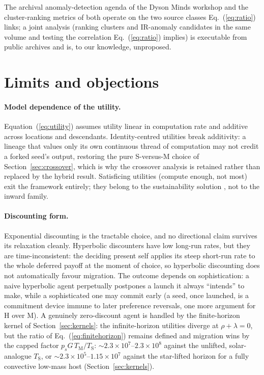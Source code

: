 \documentclass[11pt]{article}
\begin{document}
The archival anomaly-detection agenda of the Dyson Minds workshop \citep{Curtis2026DysonMinds} and the cluster-ranking metrics of \citet{Huang2026Crystallization} both operate on the two source classes Eq.~(\ref{eq:ratio}) links; a joint analysis (ranking clusters and IR-anomaly candidates in the same volume and testing the correlation Eq.~(\ref{eq:ratio}) implies) is executable from public archives and is, to our knowledge, unproposed.

\section{Limits and objections}
\label{sec:limits}

\paragraph{Model dependence of the utility.} Equation~(\ref{eq:utility}) assumes utility linear in computation rate and additive across locations and descendants. Identity-centred utilities break additivity: a lineage that values only its own continuous thread of computation may not credit a forked seed's output, restoring the pure S-versus-M choice of Section~\ref{sec:crossover}, which is why the crossover analysis is retained rather than replaced by the hybrid result. Satisficing utilities (compute enough, not most) exit the framework entirely; they belong to the sustainability solution \citep{HaqqMisraBaum2009}, not to the inward family.

\paragraph{Discounting form.} Exponential discounting is the tractable choice, and no directional claim survives its relaxation cleanly. Hyperbolic discounters \citep{Laibson1997} have low long-run rates, but they are time-inconsistent: the deciding present self applies its steep short-run rate to the whole deferred payoff at the moment of choice, so hyperbolic discounting does not automatically favour migration. The outcome depends on sophistication: a naive hyperbolic agent perpetually postpones a launch it always ``intends'' to make, while a sophisticated one may commit early (a seed, once launched, is a commitment device immune to later preference reversals, one more argument for H over M). A genuinely zero-discount agent \citep{Ramsey1928,Bostrom2003} is handled by the finite-horizon kernel of Section~\ref{sec:kernels}: the infinite-horizon utilities diverge at $\rho + \lambda = 0$, but the ratio of Eq.~(\ref{eq:finitehorizon}) remains defined and migration wins by the capped factor $p_{s} G\, T_{\mathrm M}/T_{\mathrm S}$: $\sim2.3\times10^{7}$--$2.3\times10^{8}$ against the unlifted, solar-analogue $T_{\mathrm S}$, or $\sim2.3\times10^{5}$--$1.15\times10^{7}$ against the star-lifted horizon for a fully convective low-mass host (Section~\ref{sec:kernels}).
\end{document}
